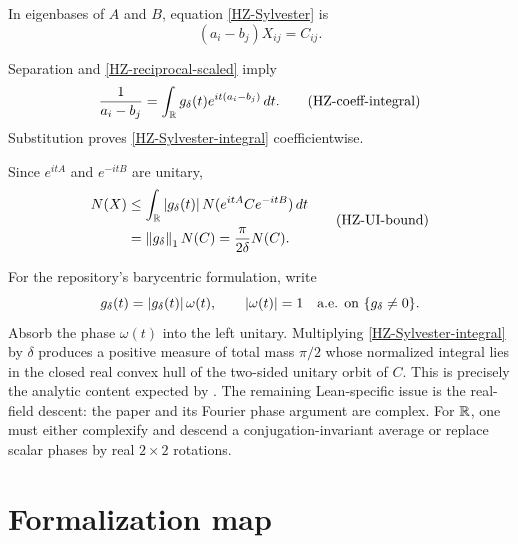 \begin{argument}
\item In eigenbases of $A$ and $B$, equation \eqref{HZ-Sylvester} is
\[
  (a_i-b_j)X_{ij}=C_{ij}.
  \tag{HZ-Sylvester-coeff}\label{HZ-Sylvester-coeff}
\]
\item Separation and \eqref{HZ-reciprocal-scaled} imply
\[
  \frac1{a_i-b_j}
  =\int_{\mathbb{R}}g_\delta(t)e^{it(a_i-b_j)}\,dt.
  \tag{HZ-coeff-integral}\label{HZ-coeff-integral}
\]
Substitution proves \eqref{HZ-Sylvester-integral} coefficientwise.
\item Since $e^{itA}$ and $e^{-itB}$ are unitary,
\[
\begin{aligned}
  N(X)
  &\le\int_{\mathbb{R}}\left\lvert g_\delta(t)\right\rvert
      N(e^{itA}Ce^{-itB})\,dt\\
  &=\left\lVert g_\delta\right\rVert_1N(C)
   =\frac\pi{2\delta}N(C).
\end{aligned}
\tag{HZ-UI-bound}\label{HZ-UI-bound}
\]
\end{argument}

For the repository's barycentric formulation, write
\[
  g_\delta(t)=\left\lvert g_\delta(t)\right\rvert\omega(t),
  \qquad\left\lvert \omega(t)\right\rvert=1
  \quad\text{a.e. on }\{g_\delta\ne0\}.
\]
Absorb the phase $\omega(t)$ into the left unitary. Multiplying \eqref{HZ-Sylvester-integral} by $\delta$ produces a positive measure of total mass $\pi/2$ whose normalized integral lies in the closed real convex hull of the two-sided unitary orbit of $C$. This is precisely the analytic content expected by
.
The remaining Lean-specific issue is the real-field descent: the paper and its Fourier phase argument are complex. For $\mathbb{R}$, one must either complexify and descend a conjugation-invariant average or replace scalar phases by real $2\times2$ rotations.

\section{Formalization map}

